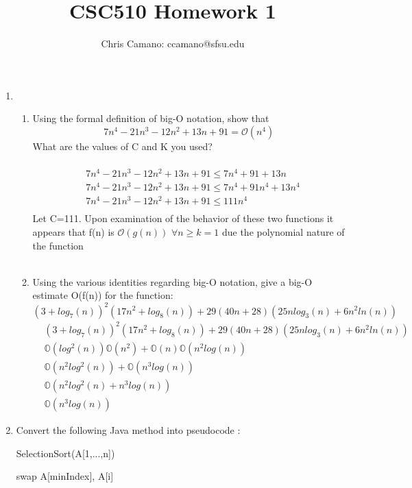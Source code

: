 \documentclass[11pt]{article}
\author{Chris Camano: ccamano@sfsu.edu}
\title{CSC510  Homework 1 }
\date
\theoremstyle{definition}  %
\begin{document}
\maketitle
\begin{enumerate}
  \item
  \begin{enumerate}
    \item  Using the formal definition of big-O notation, show that $$7n^4-21n^3-12n^2+13n+91=\mathcal{O}(n^4)$$What are the values of C and K you used?\\\\
    \begin{align*}
      &7n^4-21n^3-12n^2+13n+91\leq 7n^4+91+13n\\
      &7n^4-21n^3-12n^2+13n+91\leq 7n^4+91n^4+13n^4\\
      &7n^4-21n^3-12n^2+13n+91\leq 111n^4\\
    \end{align*}
    Let C=111. Upon examination of the behavior of these two functions it appears that f(n) is $\mathcal{O}(g(n))$ $ \forall n\geq k=1$ due the polynomial nature of the function \\\\
    \item  Using the various identities regarding big-O notation, give a big-O estimate O(f(n))
for the function:
\[
  (3+log_7(n))^2(17n^2+log_8(n))+29(40n+28)(25nlog_3(n)+6n^2ln(n))
\]
\newcommand{\bO}{\mathbb{O}}
  \begin{align*}
    &(3+log_7(n))^2(17n^2+log_8(n))+29(40n+28)(25nlog_3(n)+6n^2ln(n))\\
    &\bO(log^2(n))\bO(n^2)+\bO(n)\bO(n^2log(n))\\
    &\bO(n^2log^2(n))+\bO(n^3log(n))\\
    &\bO(n^2log^2(n)+n^3log(n))\\
    &\bO(n^3log(n))
  \end{align*}
  \end{enumerate}
  \item  Convert the following Java method into pseudocode :
  \begin{algorithm}
    \caption{SelectionSort(A[1,...,n]) }
    \label{alg:algorithm_sum}
    \begin{algorithmic}[1]
           \EndIf
          \EndFor
          \State swap A[minIndex], A[i]
        \EndFor


\end{algorithmic}
\end{algorithm}
\end{enumerate}
\end{document}
